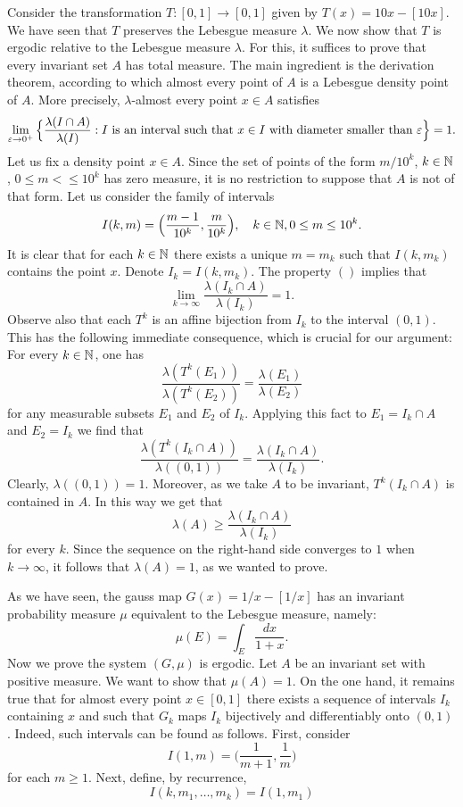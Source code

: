 \begin{example}\label{decimal expansion erdogic}
Consider the transformation $T:[0,1]\to[0,1]$ given by $T(x)=10x-[10x]$. We have seen that $T$ preserves the Lebesgue measure $\lambda$. We now show that $T$ is ergodic relative to the Lebesgue measure $\lambda$. For this, it suffices to prove that every invariant set $A$ has total measure. The main ingredient is the derivation theorem, according to which almost every point of $A$ is a Lebesgue density point of $A$. More precisely, $\lambda$-almost every point $x\in A$ satisfies
\begin{align}
\lim_{\varepsilon\to 0^+}\Big\{\frac{\lambda(I\cap A)}{\lambda(I)}:\text{$I$ is an interval such that $x\in I$ with diameter smaller than $\varepsilon$}\Big\}=1.
\end{align}
Let us fix a density point $x\in A$. Since the set of points of the form $m/10^k$, $k\in\mathbb{N}$, $0\leq m<\leq 10^k$ has zero measure, it is no restriction to suppose that $A$ is not of that form. Let us consider the family of intervals
\[I(k,m)=\Big(\frac{m-1}{10^k},\frac{m}{10^k}\Big),\quad k\in\mathbb{N},0\leq m\leq 10^k.\]
It is clear that for each $k\in\mathbb{N}$ there exists a unique $m=m_k$ such that $I(k,m_k)$ contains the point $x$. Denote $I_k=I(k,m_k)$. The property $()$ implies that
\[\lim_{k\to\infty}\frac{\lambda(I_k\cap A)}{\lambda(I_k)}=1.\]
Observe also that each $T^k$ is an affine bijection from $I_k$ to the interval $(0,1)$. This has the following immediate consequence, which is crucial for our argument: For every $k\in\mathbb{N}$, one has
\[\frac{\lambda(T^k(E_1))}{\lambda(T^k(E_2))}=\frac{\lambda(E_1)}{\lambda(E_2)}\]
for any measurable subsets $E_1$ and $E_2$ of $I_k$. Applying this fact to $E_1=I_k\cap A$ and $E_2=I_k$ we find that
\[\frac{\lambda(T^k(I_k\cap A))}{\lambda((0,1))}=\frac{\lambda(I_k\cap A)}{\lambda(I_k)}.\]
Clearly, $\lambda((0,1))=1$. Moreover, as we take $A$ to be invariant, $T^k(I_k\cap A)$ is contained in $A$. In this way we get that
\[\lambda(A)\geq\frac{\lambda(I_k\cap A)}{\lambda(I_k)}\]
for every $k$. Since the sequence on the right-hand side converges to $1$ when $k\to\infty$, it follows that $\lambda(A)=1$, as we wanted to prove.
\end{example}
\begin{example}
As we have seen, the gauss map $G(x)=1/x-[1/x]$ has an invariant probability measure $\mu$ equivalent to the Lebesgue measure, namely:
\[\mu(E)=\int_E\frac{dx}{1+x}.\]
Now we prove the system $(G,\mu)$ is ergodic. Let $A$ be an invariant set with positive measure. We want to show that $\mu(A)=1$. On the one hand, it remains true that for almost every point $x\in[0,1]$ there exists a sequence of intervals $I_k$ containing $x$ and such that $G_k$ maps $I_k$ bijectively and differentiably onto $(0,1)$. Indeed, such intervals can be found as follows. First, consider
\[I(1,m)=\Big(\frac{1}{m+1},\frac{1}{m}\Big)\]
for each $m\geq 1$. Next, define, by recurrence,
\[I(k,m_1,\dots,m_k)=I(1,m_1)\]
\end{example}

